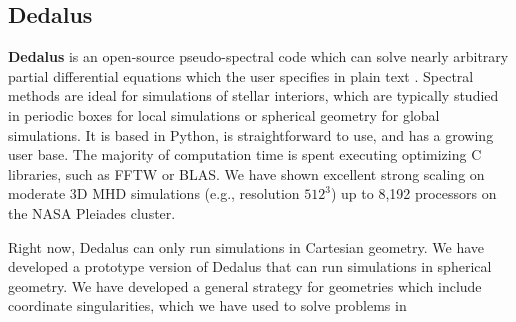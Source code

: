 {\color{purple}    
\subsection{Dedalus}}

\textbf{Dedalus} is an open-source pseudo-spectral code which can solve nearly arbitrary partial differential equations which the user specifies in plain text \citep[][source code at: dedalus-project.org]{Burns2016}. Spectral methods are ideal for simulations of stellar interiors, which are typically studied in periodic boxes for local simulations or spherical geometry for global simulations. It is based in Python, is straightforward to use, and has a growing user base. The majority of computation time is spent executing optimizing C libraries, such as FFTW or BLAS. We have shown excellent strong scaling on moderate 3D MHD simulations (e.g., resolution $512^3$) up to 8,192 processors on the NASA Pleiades cluster.

Right now, Dedalus can only run simulations in Cartesian geometry. We have developed a prototype version of Dedalus that can run simulations in spherical geometry. We have developed a general strategy for geometries which include coordinate singularities, which we have used to solve problems in \cite{Vasil_2016}


